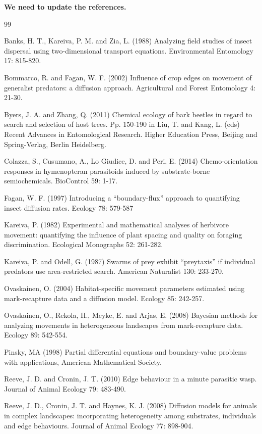 \documentclass[11pt]{article}
\begin{document}
{\bf We need to update the references.}
\begin{thebibliography}{99}

\bibitem{} Banks, H. T., Kareiva, P. M. and Zia, L. (1988) Analyzing field studies of insect dispersal using two-dimensional transport equations. Environmental Entomology 17: 815-820.  

\bibitem{} Bommarco, R. and Fagan, W. F. (2002) Influence of crop edges on movement of generalist predators: a diffusion approach.  Agricultural and Forest Entomology 4: 21-30.

\bibitem{} Byers, J. A. and Zhang, Q. (2011) Chemical ecology of bark beetles in regard to search and selection of host trees. Pp. 150-190 in Liu, T. and Kang, L. (eds) Recent Advances in Entomological Research.  Higher Education Press, Beijing and Spring-Verlag, Berlin Heidelberg.

\bibitem{} Colazza, S., Cusumano, A., Lo Giudice, D. and Peri, E. (2014) Chemo-orientation responses in hymenopteran parasitoids induced by substrate-borne semiochemicals.  BioControl 59: 1-17.

\bibitem{} Fagan, W. F. (1997) Introducing a ``boundary-flux'' approach to quantifying insect diffusion rates. Ecology 78: 579-587

\bibitem{} Kareiva, P. (1982) Experimental and mathematical analyses of herbivore movement: quantifying the influence of plant spacing and quality on foraging discrimination. Ecological Monographs 52: 261-282.

\bibitem{} Kareiva, P. and Odell, G. (1987) Swarms of prey exhibit ``preytaxis'' if individual predators use area-restricted search.  American Naturalist 130: 233-270.

\bibitem{} Ovaskainen, O. (2004) Habitat-specific movement parameters estimated using mark-recapture data and a diffusion model.  Ecology 85: 242-257.

\bibitem{} Ovaskainen, O., Rekola, H., Meyke, E. and Arjas, E. (2008) Bayesian methods for analyzing movements in heterogeneous landscapes from mark-recapture data.  Ecology 89: 542-554.

 Pinsky, MA (1998) Partial differential equations and boundary-value problems with applications, American Mathematical Society.

\bibitem{} Reeve, J. D. and Cronin, J. T. (2010) Edge behaviour in a minute parasitic wasp. Journal of Animal Ecology 79: 483-490.

\bibitem{} Reeve, J. D., Cronin, J. T. and Haynes, K. J. (2008) Diffusion models for animals in complex landscapes: incorporating heterogeneity among substrates, individuals and edge behaviours.  Journal of Animal Ecology 77: 898-904.


\end{thebibliography}
\end{document}
